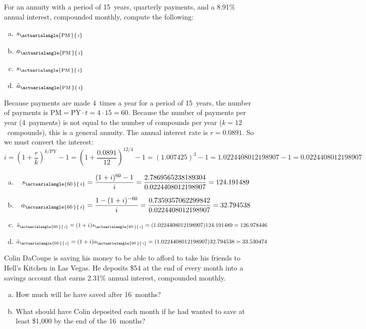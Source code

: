 \documentclass[11pt,letterpaper]{article}
\newcommand{\actS}[2]{s_{\actuarialangle{#1\,}{\,#2}}} %
\newcommand{\actSD}[2]{\ddot{s}_{\actuarialangle{#1\,}{\,#2}}} %
\newcommand{\actA}[2]{a_{\actuarialangle{#1\,}{\,#2}}} %
\newcommand{\actAD}[2]{\ddot{a}_{\actuarialangle{#1\,}{\,#2}}} %
\begin{document}

 For an annuity with a period of 15~years, quarterly payments, and a 8.91\% annual interest, compounded monthly, compute the following:
	\begin{enumerate}[(a)]
	\item $\actS{\text{PM}}{i}$
	\item $\actA{\text{PM}}{i}$
	\item $\actS{\text{PM}}{i}$
	\item $\actAD{\text{PM}}{i}$
	\end{enumerate} \pspace

\sol Because payments are made 4~times a year for a period of 15~years, the number of payments is $\text{PM}= \text{PY} \cdot t= 4 \cdot 15= 60$. Because the number of payments per year (4~payments) is not equal to the number of compounds per year ($k= 12$~compounds), this is a general annuity. The annual interest rate is $r= 0.0891$. So we must convert the interest: 
	\[
	i= \left(1 + \dfrac{r}{k} \right)^{k/\text{PY}} - 1= \left(1 + \dfrac{0.0891}{12} \right)^{12/4} - 1= (1.007425)^3 - 1= 1.0224408012198907 - 1= 0.0224408012198907
	\]

\begin{enumerate}[(a)]
\item 
	\[
	\actS{60}{i}= \dfrac{(1 + i)^{60} - 1}{i}= \dfrac{2.7869565238189304}{0.0224408012198907}= 124.191489
	\] \pspace

\item 
	\[
	\actA{60}{i}= \dfrac{1 - (1 + i)^{-60}}{i}= \dfrac{0.7359357062299842}{0.0224408012198907}= 32.794538 
	\] \pspace

\item 
	\[
	\actSD{60}{i}= (1 + i) \actS{60}{i}= (1.0224408012198907) 124.191489= 126.978446 
	\] \pspace

\item 
	\[
	\actAD{60}{i}= (1 + i) \actA{60}{i}= (1.0224408012198907) 32.794538= 33.530474
	\]
\end{enumerate}



\newpage



 Colin DaCoupe is saving his money to be able to afford to take his friends to Hell's Kitchen in Las Vegas. He deposits \$54 at the end of every month into a savings account that earns 2.31\% annual interest, compounded monthly. 
	\begin{enumerate}[(a)]
	\item How much will he have saved after 16~months?
	\item What should have Colin deposited each month if he had wanted to save at least \$1,000 by the end of the 16~months?
	\end{enumerate} \pspace
\end{document}
